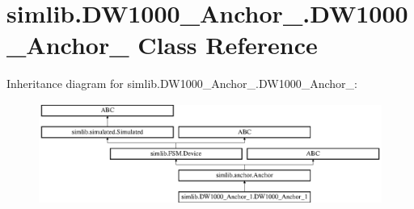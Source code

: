\hypertarget{classsimlib_1_1_d_w1000___anchor__1_1_1_d_w1000___anchor__1}{}\section{simlib.\+D\+W1000\+\_\+\+Anchor\+\_.\+D\+W1000\+\_\+\+Anchor\+\_ Class Reference}
\label{classsimlib_1_1_d_w1000___anchor__1_1_1_d_w1000___anchor__1}
Inheritance diagram for simlib.\+D\+W1000\+\_\+\+Anchor\+\_.\+D\+W1000\+\_\+\+Anchor\+\_\+:\begin{figure}[H]
\begin{center}
\leavevmode
\includegraphics[height=3.321471cm]{classsimlib_1_1_d_w1000___anchor__1_1_1_d_w1000___anchor__1}
\end{center}
\end{figure}
